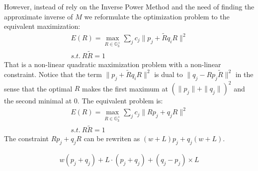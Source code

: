 \documentclass{birkjour}
\numberwithin{equation}{section}
\begin{document}
However, instead of rely on the Inverse Power Method and the need of finding the approximate inverse of $M$ we reformulate the optimization problem to the equivalent maximization:
\begin{eqnarray*}
	E(R) = \max_{R \in \mathbb{G}^{+}_3 } \sum_j { c_{j} \|p_j + \tilde R q_i R \|^2 }\\
	s.t. \ R \tilde R = 1
\end{eqnarray*}
That is a non-linear quadratic maximization problem with a non-linear constraint. Notice that the term $\|p_j + \tilde R q_i R\|^2$ is dual to $\|q_j - R p_j \tilde R\|^2$ in the sense that the optimal $R$ makes the first maximum at $(\| p_j \| +  \| q_j \|)^2$ and the second minimal at $0$. The equivalent problem is:
\begin{eqnarray*}
	E(R) = \max_{R \in \mathbb{G}^{+}_3 } \sum_j { c_{j} \|R p_j + q_j R\|^2 }\\
	s.t. \ R \tilde R = 1
\end{eqnarray*}
The constraint $R p_j + q_j R$ can be rewriten as $(w + L) p_j  + q_j (w + L)$.

\begin{eqnarray*}
    w  (p_j + q_j) + L \cdot (p_j + q_j)  + (q_j - p_j) \times L
\end{eqnarray*}
\end{document}

